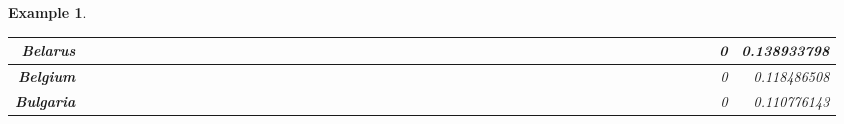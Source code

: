 \documentclass[a4paper,11pt]{report}
\newtheorem{example}[theorem]{Example}
\begin{document}
\begin{example}
\begin{appendices}
\begin{landscape}
\begin{longtable}{r|r|r|r|r|r|r|r|r|r|r|r|r|r|r|r|r|r|r|r|r|r|r|r|r|r|r|r|r|r|r|r|r|r|r|r|r|r|r|r|r|r|r|r|r|r|r|r|}
\multicolumn{1}{|r|}{\textbf{Belarus}}               &                  &                  &                  &                     &                  &                  &                                &                   &                  &                 &                  &                  &                           &                  &                 &                  &                  &                 &                  &                  &                  &                 &                &                 &                    &                &                  &                 &                 &                   &                  &                 &                     &                 &                   &                   &                &                 &                      &                          &                 &                  &                         &                 &                & 0                        & 0.138933798        \\ \hline
\multicolumn{1}{|r|}{\textbf{Belgium}}               &                  &                  &                  &                     &                  &                  &                                &                   &                  &                 &                  &                  &                           &                  &                 &                  &                  &                 &                  &                  &                  &                 &                &                 &                    &                &                  &                 &                 &                   &                  &                 &                     &                 &                   &                   &                &                 &                      &                          &                 &                  &                         &                 &                & 0                        & 0.118486508        \\ \hline
\multicolumn{1}{|r|}{\textbf{Bulgaria}}              &                  &                  &                  &                     &                  &                  &                                &                   &                  &                 &                  &                  &                           &                  &                 &                  &                  &                 &                  &                  &                  &                 &                &                 &                    &                &                  &                 &                 &                   &                  &                 &                     &                 &                   &                   &                &                 &                      &                          &                 &                  &                         &                 &                & 0                        & 0.110776143        \\ \hline

\end{longtable}
\end{landscape}
\end{appendices}
\end{example}
\end{document}
